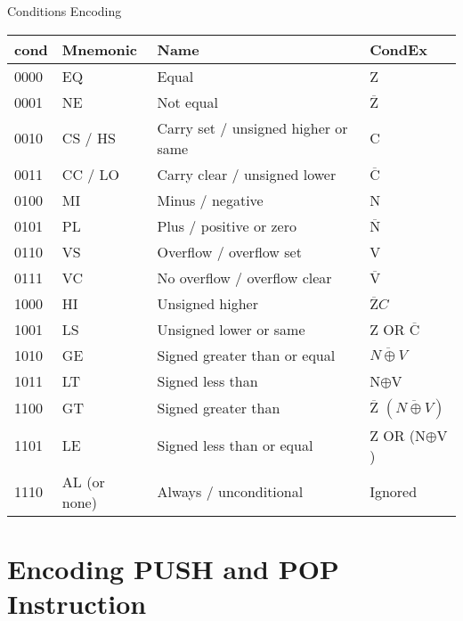 \documentclass[aspectratio=169]{beamer}
\begin{document}
\begin{frame}{Conditions Encoding}

    \tiny

    \renewcommand{\arraystretch}{1.5}
    \begin{table}[h!]
    \centering
    \begin{tabular}{|l|l|p{6cm}|l|}
        \hline
        cond & Mnemonic & Name & CondEx \\
        \hline
        0000 & EQ & Equal & Z \\
        \hline
        0001 & NE & Not equal & $\overline{\text{Z}}$ \\
        \hline
        0010 & CS / HS & Carry set / unsigned higher or same & C \\
        \hline
        0011 & CC / LO & Carry clear / unsigned lower & $\overline{\text{C}}$ \\
        \hline
        0100 & MI & Minus / negative & N \\
        \hline
        0101 & PL & Plus / positive or zero & $\overline{\text{N}}$ \\
        \hline
        0110 & VS & Overflow / overflow set & V \\
        \hline
        0111 & VC & No overflow / overflow clear & $\overline{\text{V}}$ \\
        \hline
        1000 & HI & Unsigned higher & $\overline{\text{Z}} C$ \\
        \hline
        1001 & LS & Unsigned lower or same & Z OR $\overline{\text{C}}$ \\
        \hline
        1010 & GE & Signed greater than or equal &$\overline{N \oplus V}$ \\
        \hline
        1011 & LT & Signed less than & N$\oplus$V \\
        \hline
        1100 & GT & Signed greater than & $\overline{\text{Z}}$ $(\overline{N \oplus V})$ \\
        \hline
        1101 & LE & Signed less than or equal & Z OR (N$\oplus$$\text{V}$) \\
        \hline
        1110 & AL (or none) & Always / unconditional & Ignored \\
        \hline
    \end{tabular}
\end{table}
\end{frame}


\section{Encoding PUSH and POP Instruction}
\end{document}
